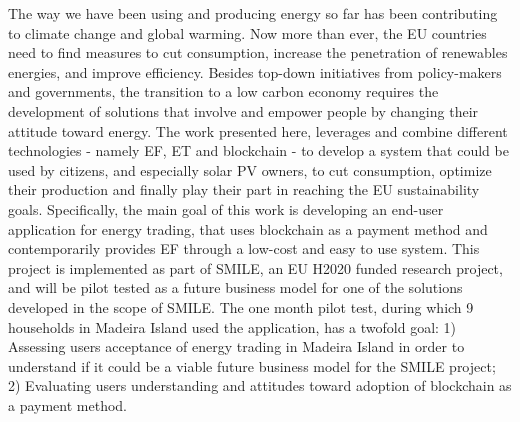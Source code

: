 \noindent The way we have been using and producing energy so far has been contributing to climate change and global warming. Now more than ever, the \ac{EU} countries need to find measures to cut consumption, increase the penetration of renewables energies, and improve efficiency. Besides top-down initiatives from policy-makers and governments, the transition to a low carbon economy requires the development of solutions that involve and empower people by changing their attitude toward energy. The work presented here, leverages and combine different technologies - namely \ac{EF}, \ac{ET} and blockchain - to develop a system that could be used by citizens, and especially solar \ac{PV} owners, to cut consumption, optimize their production and finally play their part in reaching the \ac{EU} sustainability goals.
Specifically, the main goal of this work is developing an end-user application for energy trading, that uses blockchain as a payment method and contemporarily provides \ac{EF} through a low-cost and easy to use system. This project is implemented as part of \ac{SMILE}, an \ac{EU} H2020 funded research project, and will be pilot tested as a future business model for one of the solutions developed in the scope of SMILE.
The one month pilot test, during which 9 households in Madeira Island used the application, has a twofold goal:
1) Assessing users acceptance of energy trading in Madeira Island in order to understand if it could be a viable future business model for the \ac{SMILE} project;
2) Evaluating users understanding  and attitudes toward adoption of blockchain as a payment method.
